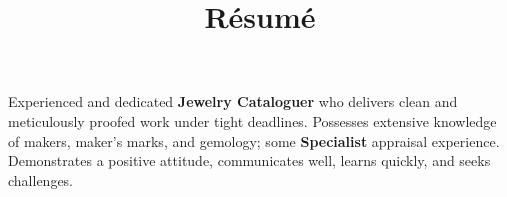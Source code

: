 \documentclass[10pt,letterpaper,sans]{moderncv}
\title{Résumé}
\begin{document}
\makecvtitle
Experienced and dedicated \textbf{Jewelry Cataloguer} who delivers clean and meticulously proofed work under tight deadlines. Possesses extensive knowledge of makers, maker’s marks, and gemology; some \textbf{Specialist} appraisal experience. Demonstrates a positive attitude, communicates well, learns quickly, and seeks challenges.
\vspace{5mm}




\end{document}
